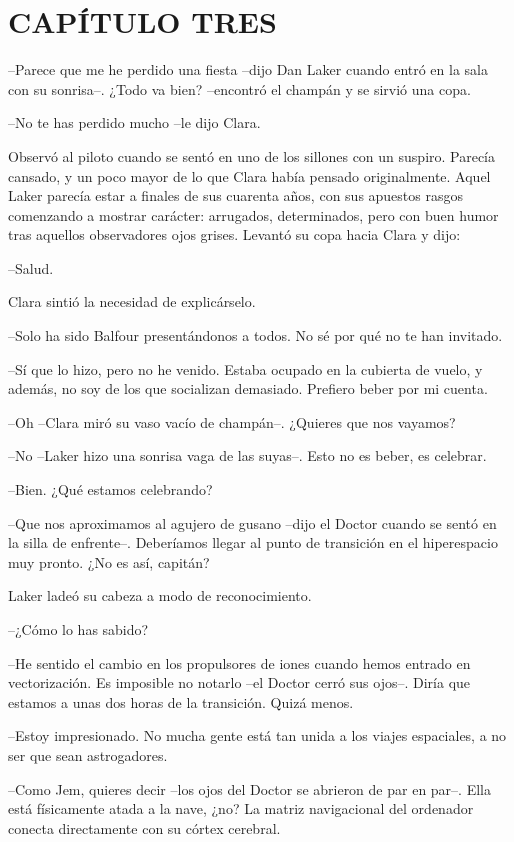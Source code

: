 \chapter*{CAPÍTULO TRES}

{--Parece que me he perdido una fiesta --dijo Dan Laker cuando entró en
 la sala con su sonrisa--. ¿Todo va bien? --encontró el champán y se
sirvió una copa.}

{--No te has perdido mucho --le dijo Clara.}

{Observó al piloto cuando se sentó en uno de los sillones con un suspiro.
 Parecía cansado, y un poco mayor de lo que Clara había pensado
 originalmente. Aquel Laker parecía estar a finales de sus cuarenta años,
 con sus apuestos rasgos comenzando a mostrar carácter: arrugados,
 determinados, pero con buen humor tras aquellos observadores ojos
grises. Levantó su copa hacia Clara y dijo:}

{--Salud.}

{Clara sintió la necesidad de explicárselo.}

{--Solo ha sido Balfour presentándonos a todos. No sé por qué no te han
invitado.}

{--Sí que lo hizo, pero no he venido. Estaba ocupado en la cubierta de
 vuelo, y además, no soy de los que socializan demasiado. Prefiero beber
por mi cuenta.}

{--Oh --Clara miró su vaso vacío de champán--. ¿Quieres que nos
vayamos?}

{--No --Laker hizo una sonrisa vaga de las suyas--. Esto no es beber, es
celebrar.}

{--Bien. ¿Qué estamos celebrando?}

{--Que nos aproximamos al agujero de gusano --dijo el Doctor cuando se
 sentó en la silla de enfrente--. Deberíamos llegar al punto de
transición en el hiperespacio muy pronto. ¿No es así, capitán?}

{Laker ladeó su cabeza a modo de reconocimiento.}

{--¿Cómo lo has sabido?}

{--He sentido el cambio en los propulsores de iones cuando hemos entrado
 en vectorización. Es imposible no notarlo --el Doctor cerró sus ojos--.
Diría que estamos a unas dos horas de la transición. Quizá menos.}

{--Estoy impresionado. No mucha gente está tan unida a los viajes
espaciales, a no ser que sean astrogadores.}

{--Como Jem, quieres decir --los ojos del Doctor se abrieron de par en
 par--. Ella está físicamente atada a la nave, ¿no? La matriz
 navigacional del ordenador conecta directamente con su córtex
cerebral.}

